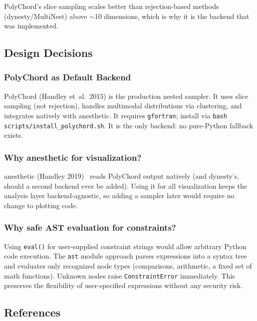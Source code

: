PolyChord's slice sampling scales better than rejection-based methods
(dynesty/MultiNest) above $\sim$10 dimensions, which is why it is the backend
that was implemented.

\subsection{Design Decisions}
\label{sec:inference-design}

\subsubsection{PolyChord as Default Backend}

PolyChord (Handley et~al.\ 2015) is the production nested sampler.
It uses slice sampling (not rejection), handles multimodal distributions
via clustering, and integrates natively with anesthetic.  It requires
\texttt{gfortran}; install via \texttt{bash scripts/install\_polychord.sh}.
It is the only backend: no pure-Python fallback exists.

\subsubsection{Why anesthetic for visualization?}

anesthetic (Handley 2019)~\cite{handley2019anesthetic} reads PolyChord output
natively (and dynesty's, should a second backend ever be added).  Using it for
all visualization keeps the analysis layer backend-agnostic, so adding a sampler
later would require no change to plotting code.

\subsubsection{Why safe AST evaluation for constraints?}

Using \texttt{eval()} for user-supplied constraint strings would allow arbitrary
Python code execution.  The \texttt{ast} module approach parses expressions into
a syntax tree and evaluates only recognized node types (comparisons, arithmetic,
a fixed set of math functions).  Unknown nodes raise \texttt{ConstraintError}
immediately.  This preserves the flexibility of user-specified expressions
without any security risk.

\subsection{References}
\label{sec:inference-references}

